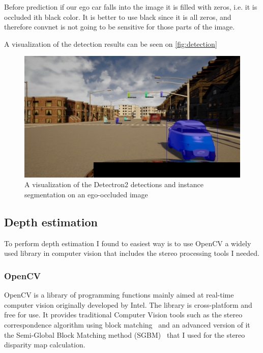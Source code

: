 Before prediction if our ego car falls into the image it is filled with zeros,
i.e. it is occluded ith black color. It is better to use black since it is all
zeros, and therefore convnet is not going to be sensitive for those parts of the
image.

A visualization of the detection results can be seen on \autoref{fig:detection}

\begin{figure}[!ht]
    \centering
    \includegraphics[width=150mm, keepaspectratio]{figures/335DET.jpg}
    \caption{A visualization of the Detectron2 detections and instance segmentation on an ego-occluded image}
    \label{fig:detection}
\end{figure}

\subsection{Depth estimation}
To perform depth estimation I found to easiest way is to use OpenCV a widely
used library in computer vision that includes the stereo processing tools I
needed.
\subsubsection{OpenCV}
OpenCV is a library of programming functions mainly aimed at real-time computer
vision originally developed by Intel. The library is cross-platform and free for
use. It provides traditional Computer Vision tools such as the stereo
correspondence algorithm using block matching~\cite{5489515} and an advanced
version of it the Semi-Global Block Matching method (SGBM)~\cite{4359315} that I used
for the stereo disparity map calculation.
